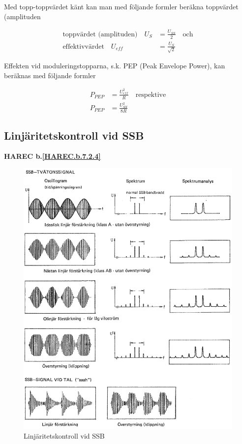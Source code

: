 Med topp-toppvärdet känt kan man med följande formler beräkna
toppvärdet (amplituden

\begin{align*}
  \text{toppvärdet (amplituden)} \quad
  U_S & = \frac{U_{SS}}{2}
  \quad \text{och} \\
  \text{effektivvärdet} \quad
  U_{eff} & = \frac{U_S}{\sqrt{2}}
\end{align*}

Effekten vid moduleringstopparna, s.k. PEP (Peak Envelope Power), kan
beräknas med följande formler

\begin{align*}
  P_{PEP} &= \frac{U_{eff}^2}{R} \quad \text{respektive} \\
  P_{PEP} &= \frac{U_{SS}^2}{8R}
\end{align*}

\subsection{Linjäritetskontroll vid SSB}
\textbf{HAREC
  b.\ref{HAREC.b.7.2.4}\label{myHAREC.b.7.2.4}
}

\begin{figure}
\includegraphics[width=\textwidth]{images/cropped_pdfs/bild_2_3-53.pdf}
\caption{Linjäritetskontroll vid SSB}
\label{fig:BildII3-53}
\end{figure}

